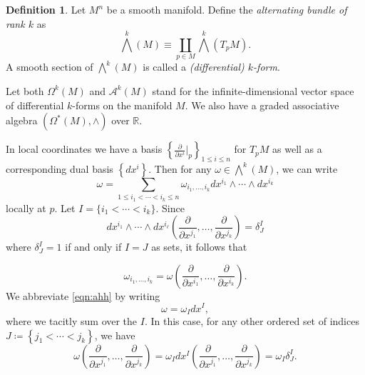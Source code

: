 \documentclass[10pt,letterpaper,cm]{nupset}
\theoremstyle{definition}
\newtheorem{definition}{Definition}[subsection]
\theoremstyle{theorem}
\theoremstyle{remark}
\newcommand{\R}{\mathbb R}
\newcommand{\1}{\mathbf{1}}
\newcommand{\0}{\vec 0}
\begin{document}
\begin{definition}
Let $M^n$ be a smooth manifold. Define the \textit{alternating bundle of rank $k$} as $$\bigwedge^k(M) \equiv \coprod_{p\in M} \bigwedge^k(T_pM).  $$ 
A smooth section of $\bigwedge^k(M)$ is called a \textit{(differential) $k$-form}.
\end{definition}

Let both $\Omega^k(M)$ and $\mathcal{A}^k(M)$ stand for the infinite-dimensional vector space of differential $k$-forms on the manifold $M$. We also have a graded associative algebra $\left(\Omega^{\ast}(M), \wedge \right)$ over $\R$.  


\medskip

In local coordinates we have a basis $\left\{\frac{\partial}{\partial{x^i}}\bigr\rvert_p\right\}_{1\leq i \leq n}$ for $T_pM$ as well as a corresponding dual basis $\left\{dx^i\right\}$. Then for any $\omega \in \bigwedge^k(M)$, we can write 
\[ \label{eqn:ahh}
 \omega = \sum_{1\leq i_1 < \cdots < i_k \leq n}\omega_{i_1, \ldots, i_k} dx^{i_1} \wedge \cdots \wedge dx^{i_k} 
 \tag{1}
 \] locally at $p$. Let $I =  \{i_1 < \cdots < i_k\}$. Since $$dx^{i_1} \wedge \cdots \wedge dx^{i_{\ell}}\left( \frac{\partial}{\partial{x^{j_1}}}, \ldots, \frac{\partial}{\partial{x^{j_k}}} \right) = \delta^I_J$$ where $\delta^I_J = 1$ if and only if $I = J$ as sets, it follows that

\[
\label{eqn:twoo}
\omega_{i_1, \ldots, i_k}  = \omega\left(\frac{\partial}{\partial{x^{i_1}}}, \ldots, \frac{\partial}{\partial{x^{i_k}}}\right).
\tag{2} \] We abbreviate \eqref{eqn:ahh} by writing $$\omega = \omega_I dx^I,$$ where we tacitly sum over the $I$. In this case, for any other ordered set of indices $J \coloneqq \left\{j_1< \cdots < j_k\right\}$, we have 
\[
\omega\left(\frac{\partial}{\partial x^{j_{1}}}, \dots, \frac{\partial}{\partial x^{j_{k}}}\right)=\omega_{I} d x^{I}\left(\frac{\partial}{\partial x^{j_{1}}}, \dots, \frac{\partial}{\partial x^{j_{k}}}\right) = \omega_I{\delta_J^I}.
\]
\end{document}
